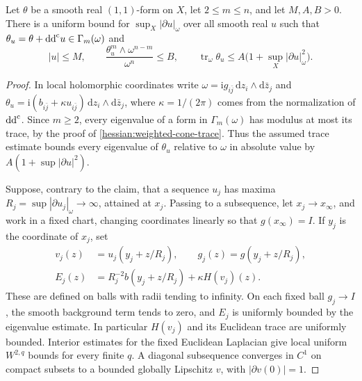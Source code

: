 \begin{proposition}\label{hessian:hessian-trace-to-gradient}
Let $\theta$ be a smooth real $(1,1)$-form on $X$, let $2\leq m\leq n$, and let $M,A,B>0$.
There is a uniform bound for $\sup_X|\partial u|_\omega$ over all smooth real $u$ such that $\theta_u=\theta+\mathrm{dd}^{\mathrm{c}} u\in\Gamma_m(\omega)$ and
\[
 |u|\leq M,\qquad
 \frac{\theta_u^m\wedge\omega^{n-m}}{\omega^n}\leq B,
 \qquad
 \operatorname{tr}_\omega\theta_u
       \leq A\bigl(1+\sup_X|\partial u|_\omega^2\bigr).
\]
\end{proposition}
\begin{proof}
In local holomorphic coordinates write $\omega=\mathrm i g_{i\bar j}\,\mathrm dz_i\wedge\mathrm d\bar z_j$ and $\theta_u=\mathrm i(b_{i\bar j}+\kappa u_{i\bar j})\,\mathrm dz_i\wedge\mathrm d\bar z_j$, where $\kappa=1/(2\pi)$ comes from the normalization of $\mathrm{dd}^{\mathrm{c}}$.
Since $m\geq2$, every eigenvalue of a form in $\Gamma_m(\omega)$ has modulus at most its trace, by the proof of \cref{hessian:weighted-cone-trace}. Thus the assumed trace estimate bounds every eigenvalue of $\theta_u$ relative to $\omega$ in absolute value by $A(1+\sup|\partial u|^2)$.

Suppose, contrary to the claim, that a sequence $u_j$ has maxima $R_j=\sup|\partial u_j|_\omega\to\infty$, attained at $x_j$. Passing to a subsequence, let $x_j\to x_\infty$, and work in a fixed chart, changing coordinates linearly so that $g(x_\infty)=I$. If $y_j$ is the coordinate of $x_j$, set
\begin{align*}
 v_j(z)&=u_j(y_j+z/R_j),\qquad g_j(z)=g(y_j+z/R_j),\\
 E_j(z)&=R_j^{-2}b(y_j+z/R_j)+\kappa H(v_j)(z).
\end{align*}
These are defined on balls with radii tending to infinity. On each fixed ball $g_j\to I$, the smooth background term tends to zero, and $E_j$ is uniformly bounded by the eigenvalue estimate. In particular $H(v_j)$ and its Euclidean trace are uniformly bounded.
Interior estimates for the fixed Euclidean Laplacian give local uniform $W^{2,q}$ bounds for every finite $q$. A diagonal subsequence converges in $C^1$ on compact subsets to a bounded globally Lipschitz $v$, with $|\partial v(0)|=1$.


\end{proof}
